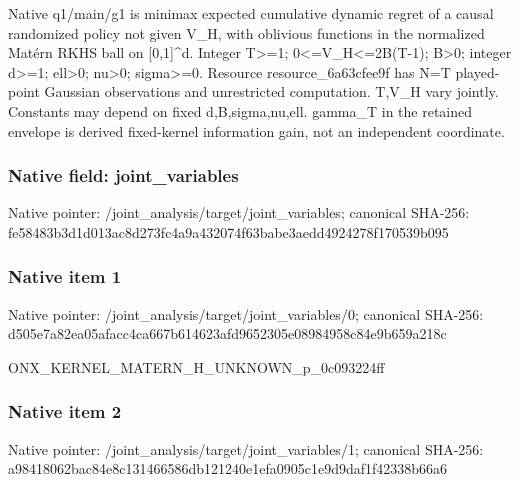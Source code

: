 \documentclass[10pt,a4paper]{article}
\begin{document}
\begingroup\raggedright\sloppy Native q1/\allowbreak{}main/\allowbreak{}g1 is minimax expected cumulative dynamic regret of a causal randomized policy not given V\_\allowbreak{}H,\allowbreak{} with oblivious functions in the normalized Mat{\AtlasUnicodeText é}\allowbreak{}rn RKHS ball on [0,\allowbreak{}1]\textasciicircum{}d. Integer T>=\allowbreak{}1;\allowbreak{} 0<=\allowbreak{}V\_\allowbreak{}H<=\allowbreak{}2B(T-1);\allowbreak{} B>0;\allowbreak{} integer d>=\allowbreak{}1;\allowbreak{} ell>0;\allowbreak{} nu>0;\allowbreak{} sigma>=\allowbreak{}0. Resource resource\_\allowbreak{}6a63cfee9f has N=\allowbreak{}T played-point Gaussian observations and unrestricted computation. T,\allowbreak{}V\_\allowbreak{}H vary jointly. Constants may depend on fixed d,\allowbreak{}B,\allowbreak{}sigma,\allowbreak{}nu,\allowbreak{}ell. gamma\_\allowbreak{}T in the retained envelope is derived fixed-kernel information gain,\allowbreak{} not an independent coordinate.\par\endgroup

\subsubsection{Native field: joint\_\allowbreak{}variables}
Native pointer: /joint\_\allowbreak{}analysis/target/joint\_\allowbreak{}variables; canonical SHA-256: fe58483b3d1d013ac8d273fc4a9a432074f63babe3aedd4924278f170539b095

\subsubsection{Native item 1}
Native pointer: /joint\_\allowbreak{}analysis/target/joint\_\allowbreak{}variables/0; canonical SHA-256: d505e7a82ea05afacc4ca667b614623afd9652305e08984958c84e9b659a218c

\begingroup\raggedright\sloppy ONX\_\allowbreak{}KERNEL\_\allowbreak{}MATERN\_\allowbreak{}H\_\allowbreak{}UNKNOWN\_\allowbreak{}p\_\allowbreak{}0c093224ff\par\endgroup

\subsubsection{Native item 2}
Native pointer: /joint\_\allowbreak{}analysis/target/joint\_\allowbreak{}variables/1; canonical SHA-256: a98418062bac84e8c131466586db121240e1efa0905c1e9d9daf1f42338b66a6
\end{document}
